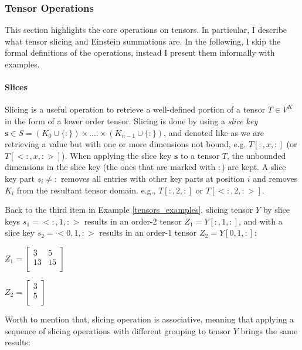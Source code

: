 \subsubsection{Tensor Operations}
\label{sec:tensor_operations}
This section highlights the core operations on tensors. In particular, I describe what tensor slicing and Einstein summations are. In the following, I skip the formal definitions of the operations, instead I present them informally with examples.


\paragraph{Slices} Slicing is a useful operation to retrieve a well-defined portion of a tensor $T \in V^{K}$ in the form of a lower order tensor. Slicing is done by using a \textit{slice key} $\textbf{s} \in S = (K_0 \cup \{:\}) \times .... \times ( K_{n-1}\cup \{:\})$, and denoted like as we are retrieving a value but with one or more dimensions not bound, e.g. $T[:, x, :]$ (or $T[<:, x, :>]$). 
When applying the slice key $\textbf{s}$ to a tensor $T$, the unbounded dimensions in the slice key (the ones that are marked with $:$) are kept. 
A slice key part $s_i \neq :$ removes
all entries with other key parts at position $i$ and removes $K_i$ from the resultant tensor domain. e.g., $T[:, 2, :]$ or $T[<:, 2, :>]$.

\begin{example}
	Back to the third item in Example \ref{tensors_examples}, slicing tensor $Y$ by slice keys $s_1 = <:, 1, :>$ results in an order-2 tensor $Z_1 = Y[:, 1, :]$, and with a slice key $s_2 = <0, 1, :>$ results in an order-1 tensor $Z_2 = Y[0, 1, :]$:\\
	
	 \centerline{$Z_1 = \left[ \begin{array}{cc} 3 & 5\\ 13 & 15 \\ \end{array}\right]$}  
	 
	 
	 \centerline{$Z_2 = \left[ \begin{array}{c} 3 \\ 5 \\ \end{array}\right]$} 
\end{example}

Worth to mention that, slicing operation is associative, meaning that applying a sequence of slicing operations with different grouping to tensor $Y$ brings the same results:

